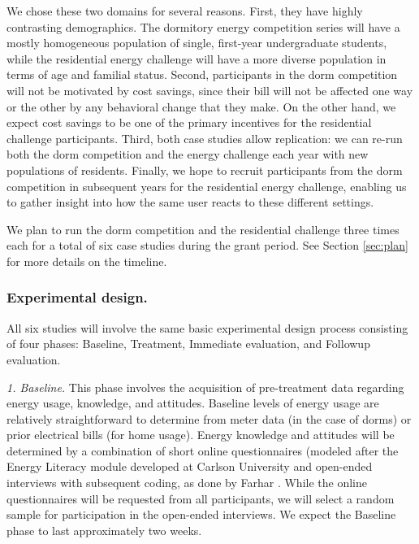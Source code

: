 We chose these two domains for several reasons. First, they have highly
contrasting demographics.  The dormitory energy competition series will
have a mostly homogeneous population of single, first-year undergraduate
students, while the residential energy challenge will have a more diverse
population in terms of age and familial status.  Second, participants in
the dorm competition will not be motivated by cost savings, since their
bill will not be affected one way or the other by any behavioral change
that they make. On the other hand, we expect cost savings to be one of the
primary incentives for the residential challenge participants.  Third, both
case studies allow replication: we can re-run both the dorm competition and
the energy challenge each year with new populations of residents.  Finally,
we hope to recruit participants from the dorm competition in subsequent
years for the residential energy challenge, enabling us to gather insight
into how the same user reacts to these different settings.

We plan to run the dorm competition and the residential challenge three
times each for a total of six case studies during the grant period.  See
Section \ref{sec:plan} for more details on the timeline.

\subsubsection{Experimental design.}

All six studies will involve the same basic experimental design process
consisting of four phases: Baseline, Treatment, Immediate evaluation, and
Followup evaluation.

{\em 1. Baseline.}  This phase involves the acquisition of
pre-treatment data regarding energy usage, knowledge, and attitudes.
Baseline levels of energy usage are relatively straightforward to determine
from meter data (in the case of dorms) or prior electrical bills (for home
usage).  Energy knowledge and attitudes will be determined by a combination
of short online questionnaires (modeled after the Energy Literacy module
developed at Carlson University \cite{DeWaters09,DeWaters09b} and
open-ended interviews with subsequent coding, as done by Farhar
\cite{Farhar09}. While the online questionnaires will be requested from all
participants, we will select a random sample for participation in the
open-ended interviews.  We expect the Baseline phase to last approximately
two weeks. 

